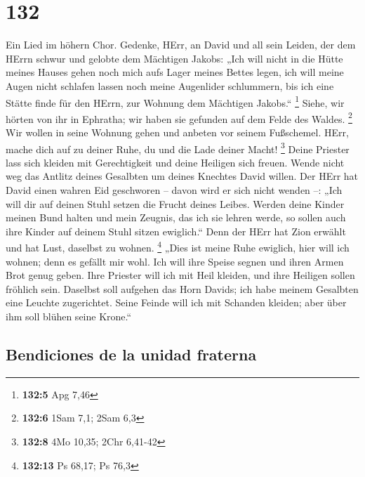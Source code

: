 \hypertarget{section-131}{%
\section{132}\label{section-131}}

 Ein Lied im höhern Chor. Gedenke, HErr, an David und all
sein Leiden,  der dem HErrn schwur und gelobte dem
Mächtigen Jakobs:  „Ich will nicht in die Hütte meines
Hauses gehen noch mich aufs Lager meines Bettes legen, 
ich will meine Augen nicht schlafen lassen noch meine Augenlider
schlummern,  bis ich eine Stätte finde für den HErrn, zur
Wohnung dem Mächtigen Jakobs.`` \footnote{\textbf{132:5} Apg 7,46}
 Siehe, wir hörten von ihr in Ephratha; wir haben sie
gefunden auf dem Felde des Waldes. \footnote{\textbf{132:6} 1Sam 7,1;
  2Sam 6,3}  Wir wollen in seine Wohnung gehen und anbeten
vor seinem Fußschemel.  HErr, mache dich auf zu deiner
Ruhe, du und die Lade deiner Macht! \footnote{\textbf{132:8} 4Mo 10,35;
  2Chr 6,41-42}  Deine Priester lass sich kleiden mit
Gerechtigkeit und deine Heiligen sich freuen.  Wende
nicht weg das Antlitz deines Gesalbten um deines Knechtes David willen.
 Der HErr hat David einen wahren Eid geschworen -- davon
wird er sich nicht wenden --: „Ich will dir auf deinen Stuhl setzen die
Frucht deines Leibes.  Werden deine Kinder meinen Bund
halten und mein Zeugnis, das ich sie lehren werde, so sollen auch ihre
Kinder auf deinem Stuhl sitzen ewiglich.``  Denn der HErr
hat Zion erwählt und hat Lust, daselbst zu wohnen. \footnote{\textbf{132:13}
  Ps 68,17; Ps 76,3}  „Dies ist meine Ruhe ewiglich, hier
will ich wohnen; denn es gefällt mir wohl.  Ich will ihre
Speise segnen und ihren Armen Brot genug geben.  Ihre
Priester will ich mit Heil kleiden, und ihre Heiligen sollen fröhlich
sein.  Daselbst soll aufgehen das Horn Davids; ich habe
meinem Gesalbten eine Leuchte zugerichtet.  Seine Feinde
will ich mit Schanden kleiden; aber über ihm soll blühen seine Krone.``

\hypertarget{bendiciones-de-la-unidad-fraterna}{%
\subsection{Bendiciones de la unidad
fraterna}\label{bendiciones-de-la-unidad-fraterna}}

